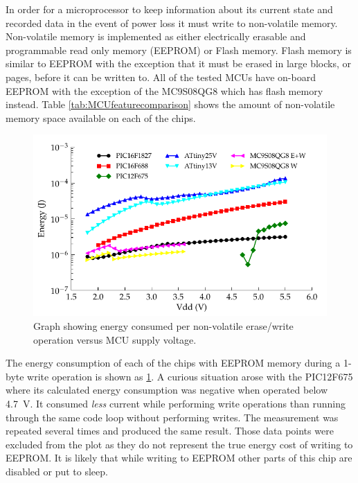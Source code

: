       In order for a microprocessor to keep information about its current state and recorded data in the event of power loss it must write to non-volatile memory.
      Non-volatile memory is implemented as either electrically erasable and programmable read only memory (EEPROM) or Flash memory.
      Flash memory is similar to EEPROM with the exception that it must be erased in large blocks, or pages, before it can be written to.
      All of the tested MCUs have on-board EEPROM with the exception of the MC9S08QG8 which has flash memory instead.
      Table \ref{tab:MCUfeaturecomparison} shows the amount of non-volatile memory space available on each of the chips.

      \begin{figure}
        \centering
        \includegraphics{content/pt1/03-EnergyRequirements/graphics/Graph_All_EEPROM_JPO}
        \caption{\label{fig:Energy-consumed-EEPROM}Graph showing energy consumed per non-volatile erase/write operation versus MCU supply voltage.}
      \end{figure}

      The energy consumption of each of the chips with EEPROM memory during a 1-byte write operation is shown as \cref{fig:Energy-consumed-EEPROM}.
      A curious situation arose with the PIC12F675 where its calculated energy consumption was negative when operated below \SI{4.7}{\volt}.
      It consumed \emph{less} current while performing write operations than running through the same code loop without performing writes.
      The measurement was repeated several times and produced the same result.
      Those data points were excluded from the plot as they do not represent the true energy cost of writing to EEPROM.
      It is likely that while writing to EEPROM other parts of this chip are disabled or put to sleep.

